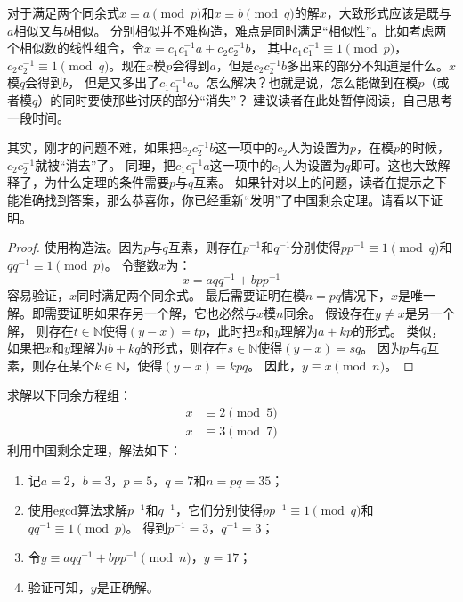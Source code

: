 对于满足两个同余式$x \equiv a \pmod{p}$和$x \equiv b \pmod{q}$的解$x$，大致形式应该是既与$a$相似又与$b$相似。
分别相似并不难构造，难点是同时满足“相似性”。比如考虑两个相似数的线性组合，令$x = c_1 c_1^{-1}a + c_2c_2^{-1}b$，
其中$c_1 c_1^{-1} \equiv 1 \pmod{p}$，
$c_2 c_2^{-1} \equiv 1 \pmod{q}$。现在$x$模$p$会得到$a$，但是$ c_2c_2^{-1}b$多出来的部分不知道是什么。$x$模$q$会得到$b$，
但是又多出了$c_1 c_1^{-1}a $。怎么解决？也就是说，怎么能做到在模$p$（或者模$q$）的同时要使那些讨厌的部分“消失”？
建议读者在此处暂停阅读，自己思考一段时间。

其实，刚才的问题不难，如果把$c_2c_2^{-1}b$这一项中的$c_2$人为设置为$p$，在模$p$的时候，$c_2c_2^{-1}$就被“消去”了。
同理，把$c_1c_1^{-1}a$这一项中的$c_1$人为设置为$q$即可。这也大致解释了，为什么定理的条件需要$p$与$q$互素。
如果针对以上的问题，读者在提示之下能准确找到答案，那么恭喜你，你已经重新“发明”了中国剩余定理。请看以下证明。
\begin{proof}
	使用构造法。因为$p$与$q$互素，则存在$p^{-1}$和$q^{-1}$分别使得$p p^{-1} \equiv 1  \pmod{q}$和$qq^{-1} \equiv 1 \pmod{p}$。
	令整数$x$为：
	\[ x = a q q^{-1} + b p p^{-1} \]  
	容易验证，$x$同时满足两个同余式。
	最后需要证明在模$n = pq$情况下，$x$是唯一解。即需要证明如果存另一个解，它也必然与$x$模$n$同余。
	假设存在$ y \neq x$是另一个解，
	则存在$t \in \mathbb{N}$使得$(y - x ) = tp$，此时把$x$和$y$理解为$a + kp$的形式。
	类似，如果把$x$和$y$理解为$b + kq$的形式，则存在$s \in \mathbb{N}$使得$(y - x ) = sq$。
	因为$p$与$q$互素，则存在某个$k \in \mathbb{N}$，使得$(y - x) = kpq$。
	因此，$y \equiv x \pmod{n}$。
\end{proof}

\begin{example}
\label{exm:crt1}
		求解以下同余方程组：
		\begin{align*}
		x &\equiv  2 \pmod{5}\\
		x &\equiv 3  \pmod{7}
		\end{align*}
利用中国剩余定理，解法如下：
\begin{enumerate}
\item 记$a=2$，$b = 3$，$p = 5$，$q = 7$和$n = pq = 35$；

\item 使用$\text{egcd}$算法求解$p^{-1}$和$q^{-1}$，它们分别使得$p p^{-1} \equiv 1 \pmod{q}$和$q q^{-1} \equiv 1 \pmod{p}$。
得到$p^{-1} = 3 $，$q^{-1} = 3$；

\item 令$ y \equiv a q q^{-1} + b p p^{-1} \pmod{n}$，$y = 17$；

\item 验证可知，$y$是正确解。
\end{enumerate}
\end{example}

